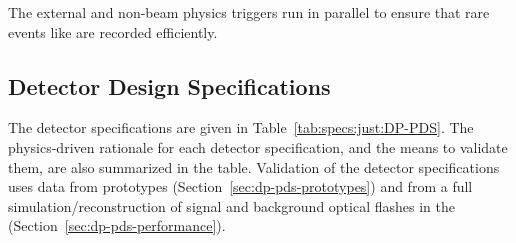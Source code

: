 The external and non-beam physics triggers run in parallel to ensure that rare events like  are recorded efficiently. 

\subsection{Detector Design Specifications}
\label{sec:dp-pds-overview_specs}

The \dual {} detector specifications are given in Table~\ref{tab:specs:just:DP-PDS}. The physics-driven rationale for each detector specification, and the means to validate them, are also summarized in the table. Validation of the detector specifications uses data from  prototypes (Section~\ref{sec:dp-pds-prototypes}) and from a full simulation/reconstruction of signal and background optical flashes in the \dpmod (Section~\ref{sec:dp-pds-performance}). 


%


